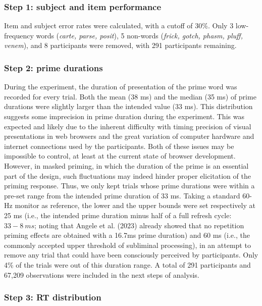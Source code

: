 \documentclass[
]{interact}
\begin{document}
\subsubsection{Step 1: subject and item
performance}\label{sec-exp1-analysis-performance}

Item and subject error rates were calculated, with a cutoff of 30\%.
Only 3 low-frequency words (\emph{carte, parse, posit}), 5 non-words
(\emph{frick, gotch, phasm, pluff, venem}), and 8 participants were
removed, with 291 participants remaining.

\subsubsection{Step 2: prime
durations}\label{sec-exp1-analysis-primeTime}

During the experiment, the duration of presentation of the prime word
was recorded for every trial. Both the mean (38 ms) and the median (35
ms) of prime durations were slightly larger than the intended value (33
ms). This distribution suggests some imprecision in prime duration
during the experiment. This was expected and likely due to the inherent
difficulty with timing precision of visual presentations in web browsers
and the great variation of computer hardware and internet connections
used by the participants. Both of these issues may be impossible to
control, at least at the current state of browser development. However,
in masked priming, in which the duration of the prime is an essential
part of the design, such fluctuations may indeed hinder proper
elicitation of the priming response. Thus, we only kept trials whose
prime durations were within a pre-set range from the intended prime
duration of 33 ms. Taking a standard 60-Hz monitor as reference, the
lower and the upper bounds were set respectively at 25 ms (i.e., the
intended prime duration minus half of a full refresh cycle:
\(33-8~ ms\); noting that Angele et al. (2023) already showed that no
repetition priming effects are obtained with a 16.7ms prime duration)
and 60 ms (i.e., the commonly accepted upper threshold of subliminal
processing), in an attempt to remove any trial that could have been
consciously perceived by participants. Only 4\% of the trials were out
of this duration range. A total of 291 participants and 67,209
observations were included in the next steps of analysis.

\subsubsection{Step 3: RT distribution}\label{sec-exp1-analysis-RT}
\end{document}
